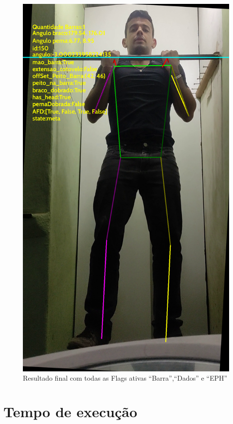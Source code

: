 \begin{figure}[H]
	\centering
	\caption{Resultado final com todas as Flags ativas ``Barra'',``Dados'' e ``EPH''}
	\includegraphics[scale=0.2]{figuras/flags.png}
\end{figure}



\section[Tempo de execução]{Tempo de execução}

